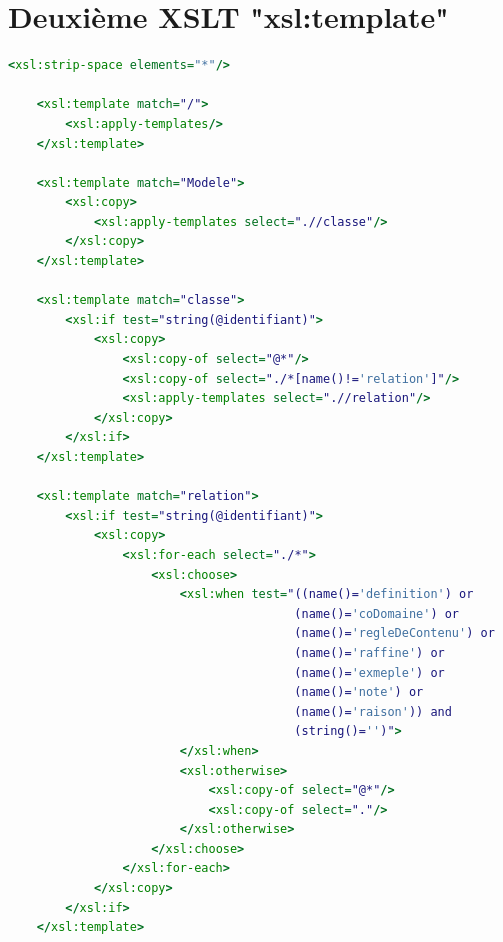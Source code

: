 \documentclass[11pt]{report}
\begin{document}
\section{Deuxième XSLT "xsl:template"}
\begin{lstlisting}[language=XSLT]
    <xsl:strip-space elements="*"/>

    <xsl:template match="/">
        <xsl:apply-templates/>
    </xsl:template>

    <xsl:template match="Modele">
        <xsl:copy>
            <xsl:apply-templates select=".//classe"/>
        </xsl:copy>
    </xsl:template>

    <xsl:template match="classe">
        <xsl:if test="string(@identifiant)">
            <xsl:copy>
                <xsl:copy-of select="@*"/>
                <xsl:copy-of select="./*[name()!='relation']"/>
                <xsl:apply-templates select=".//relation"/>
            </xsl:copy>
        </xsl:if>
    </xsl:template>

    <xsl:template match="relation">
        <xsl:if test="string(@identifiant)">
            <xsl:copy>
                <xsl:for-each select="./*">
                    <xsl:choose>
                        <xsl:when test="((name()='definition') or
                                        (name()='coDomaine') or 
                                        (name()='regleDeContenu') or
                                        (name()='raffine') or 
                                        (name()='exmeple') or
                                        (name()='note') or
                                        (name()='raison')) and 
                                        (string()='')">
                        </xsl:when>
                        <xsl:otherwise>
                            <xsl:copy-of select="@*"/>
                            <xsl:copy-of select="."/>
                        </xsl:otherwise>
                    </xsl:choose>
                </xsl:for-each>
            </xsl:copy>
        </xsl:if>
    </xsl:template>
\end{lstlisting}
\end{document}
